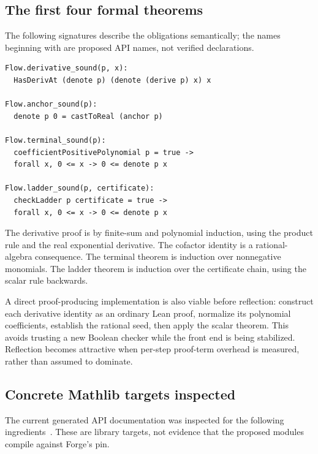 \subsection{The first four formal theorems}

The following signatures describe the obligations semantically; the names beginning with  are proposed API names, not verified declarations.

\par\noindent\begin{minipage}{\textwidth}
\begin{lstlisting}
Flow.derivative_sound(p, x):
  HasDerivAt (denote p) (denote (derive p) x) x

Flow.anchor_sound(p):
  denote p 0 = castToReal (anchor p)

Flow.terminal_sound(p):
  coefficientPositivePolynomial p = true ->
  forall x, 0 <= x -> 0 <= denote p x

Flow.ladder_sound(p, certificate):
  checkLadder p certificate = true ->
  forall x, 0 <= x -> 0 <= denote p x
\end{lstlisting}
\end{minipage}\par

The derivative proof is by finite-sum and polynomial induction, using the product rule and the real exponential derivative. The cofactor identity is a rational-algebra consequence. The terminal theorem is induction over nonnegative monomials. The ladder theorem is induction over the certificate chain, using the scalar rule backwards.

A direct proof-producing implementation is also viable before reflection: construct each derivative identity as an ordinary Lean proof, normalize its polynomial coefficients, establish the rational seed, then apply the scalar theorem. This avoids trusting a new Boolean checker while the front end is being stabilized. Reflection becomes attractive when per-step proof-term overhead is measured, rather than assumed to dominate.

\subsection{Concrete Mathlib targets inspected}

The current generated API documentation was inspected for the following ingredients~\cite{mathlib-exp,mathlib-mvt,mathlib-ivt}. These are library targets, not evidence that the proposed modules compile against Forge's pin.


